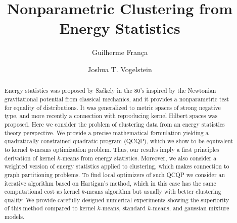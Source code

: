 \documentclass[aps,preprint,nofootinbib,floatfix]{revtex4-1}
\begin{document}
\title{Nonparametric Clustering from  Energy Statistics}

\author{Guilherme Fran\c ca}

\author{Joshua T. Vogelstein}



\begin{abstract}
Energy statistics 
was proposed by 
Sz\' ekely in the 80's
inspired by the Newtonian gravitational potential from classical mechanics,
and it provides a nonparametric test for equality of distributions.
It was generalized to 
metric spaces of strong negative type,
and more recently a connection with reproducing kernel Hilbert spaces 
was proposed.
Here we consider the problem of clustering data from
an energy statistics theory perspective.
We provide a precise mathematical formulation yielding
a quadratically constrained quadratic program (QCQP), which we show
to be equivalent
to kernel $k$-means optimization problem.
Thus, our results imply a first principles derivation of 
kernel $k$-means from energy statistics.
Moreover, we also consider a weighted version of energy statistics 
applied to clustering, which makes connection to 
graph partitioning problems.
To find local optimizers of such QCQP we consider an iterative
algorithm based on Hartigan's method, which in this case
has the same computational cost 
as kernel $k$-means algorithm but usually with better clustering
quality. We provide carefully designed numerical experiments
showing the superiority of this method compared to
kernel $k$-means, standard $k$-means, and gaussian mixture models.
\end{abstract}
\end{document}
